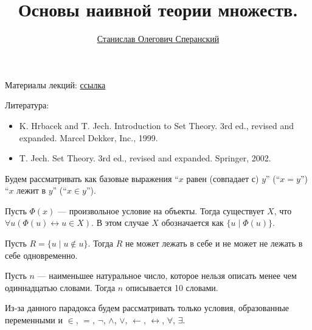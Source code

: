 \documentclass[12pt,a4paper]{article}
\title{Основы наивной теории множеств.}
\author{\href{https://users.math-cs.spbu.ru/~speranski}{Станислав Олегович Сперанский}}
\date{}
\begin{document}
    \maketitle

    Материалы лекций: \href{https://users.math-cs.spbu.ru/~speranski/courses/sets-2020-autumn/materials.html}{ссылка}
    
    Литература:
    \begin{itemize}
        \item K. Hrbacek and T. Jech. Introduction to Set Theory. 3rd ed., revised and expanded. Marcel Dekker, Inc., 1999.
        \item T. Jech. Set Theory. 3rd ed., revised and expanded. Springer, 2002.
    \end{itemize}

    Будем рассматривать как базовые выражения ``$x$ равен (совпадает с) $y$'' (``$x=y$'') ``$x$ лежит в $y$'' (``$x\in y$'').

    \begin{definition}
        Пусть $\Phi(x)$ --- произвольное условие на объекты. Тогда существует $X$, что $\forall u (\Phi(u) \leftrightarrow u \in X)$. В этом случае $X$ обозначается как $\{u \mid \Phi(u)\}$.
    \end{definition}

    \begin{statement}
        Пусть $R = \{u \mid u \notin u\}$. Тогда $R$ не может лежать в себе и не может не лежать в себе одновременно.
    \end{statement}

    \begin{statement}
        Пусть $n$ --- наименьшее натуральное число, которое нельзя описать менее чем одиннадцатью словами. Тогда $n$ описывается 10 словами.
    \end{statement}

    Из-за данного парадокса будем рассматривать только условия, образованные переменными и $\in$, $=$, $\neg$, $\wedge$, $\vee$, $\leftarrow$, $\leftrightarrow$, $\forall$, $\exists$.
\end{document}
